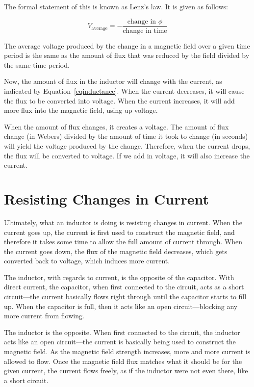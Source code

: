 The formal statement of this is known as Lenz's law.  It is given as follows:

\begin{equation}
\label{eqlenz}
V_{\textrm{average}} = -\frac{\textrm{change in }\phi}{\textrm{change in time}}
\end{equation}

The average voltage produced by the change in a magnetic field over a given time period is the same as the amount of flux that was reduced by the field divided by the same time period.

Now, the amount of flux in the inductor will change with the current, as indicated by Equation~\ref{eqinductance}.
When the current decreases, it will cause the flux to be converted into voltage.
When the current increases, it will add more flux into the magnetic field, using up voltage.

When the amount of flux changes, it creates a voltage.
The amount of flux change (in Webers) divided by the amount of time it took to change (in seconds) will yield the voltage produced by the change.
Therefore, when the current drops, the flux will be converted to voltage.
If we add in voltage, it will also increase the current.

\section{Resisting Changes in Current}

Ultimately, what an inductor is doing is resisting changes in current.
When the current goes up, the current is first used to construct the magnetic field, and therefore it takes some time to allow the full amount of current through.
When the current goes down, the flux of the magnetic field decreases, which gets converted back to voltage, which induces more current.

The inductor, with regards to current, is the opposite of the capacitor.
With direct current, the capacitor, when first connected to the circuit, acts as a short circuit---the current basically flows right through until the capacitor starts to fill up.
When the capacitor is full, then it acts like an open circuit---blocking any more current from flowing.

The inductor is the opposite.
When first connected to the circuit, the inductor acts like an open circuit---the current is basically being used to construct the magnetic field.
As the magnetic field strength increases, more and more current is allowed to flow.
Once the magnetic field flux matches what it should be for the given current, the current flows freely, as if the inductor were not even there, like a short circuit.

